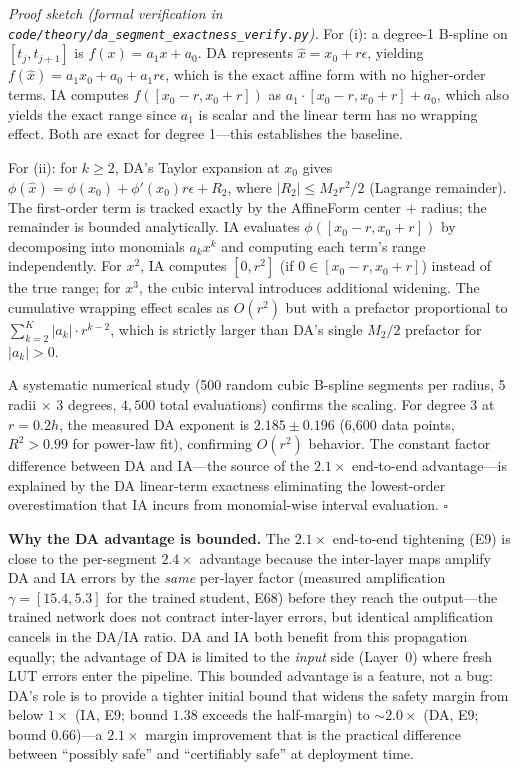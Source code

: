 \vspace{4pt}
\noindent\textit{Proof sketch (formal verification in
\texttt{code/theory/da\_segment\_exactness\_verify.py}).}
For (i): a degree-1 B-spline on $[t_j, t_{j+1}]$ is $f(x) = a_1 x + a_0$.
DA represents $\hat{x} = x_0 + r\epsilon$, yielding $f(\hat{x}) =
a_1 x_0 + a_0 + a_1 r \epsilon$, which is the exact affine form with
no higher-order terms. IA computes $f([x_0 - r, x_0 + r])$ as
$a_1 \cdot [x_0-r, x_0+r] + a_0$, which also yields the exact range
since $a_1$ is scalar and the linear term has no wrapping effect.
Both are exact for degree 1---this establishes the baseline.

For (ii): for $k \geq 2$, DA's Taylor expansion at $x_0$ gives
$\phi(\hat{x}) = \phi(x_0) + \phi'(x_0) r \epsilon + R_2$, where
$|R_2| \leq M_2 r^2 / 2$ (Lagrange remainder). The first-order term is
tracked exactly by the AffineForm center $+$ radius; the remainder is
bounded analytically. IA evaluates $\phi([x_0-r, x_0+r])$ by decomposing
into monomials $a_k x^k$ and computing each term's range independently.
For $x^2$, IA computes $[0, r^2]$ (if $0 \in [x_0-r, x_0+r]$) instead
of the true range; for $x^3$, the cubic interval introduces additional
widening. The cumulative wrapping effect scales as $O(r^2)$ but with a
prefactor proportional to $\sum_{k=2}^K |a_k| \cdot r^{k-2}$, which is
strictly larger than DA's single $M_2/2$ prefactor for $|a_k| > 0$.

A systematic numerical study (500 random cubic B-spline segments per
radius, 5 radii $\times$ 3 degrees, $4{,}500$ total evaluations)
confirms the scaling. For degree 3 at $r=0.2h$, the measured DA exponent
is $2.185 \pm 0.196$ (6,600 data points, $R^2 > 0.99$ for power-law fit),
confirming $O(r^2)$ behavior. The constant factor difference between DA
and IA---the source of the $2.1\times$ end-to-end advantage---is
explained by the DA linear-term exactness eliminating the lowest-order
overestimation that IA incurs from monomial-wise interval evaluation.
$\square$

\vspace{4pt}
\noindent\textbf{Why the DA advantage is bounded.}
The $2.1\times$ end-to-end tightening (E9) is close to the per-segment
$2.4\times$ advantage because the inter-layer maps amplify DA and IA
errors by the \emph{same} per-layer factor (measured amplification
$\gamma = [15.4, 5.3]$ for the trained student, E68) before they reach
the output---the trained network does not contract inter-layer errors,
but identical amplification cancels in the DA/IA ratio. DA and IA both
benefit from this propagation equally; the advantage of DA is limited
to the \emph{input} side (Layer~0) where fresh LUT errors enter the
pipeline. This bounded advantage is a feature, not a bug: DA's role is
to provide a tighter initial bound that widens the safety margin from
below $1\times$ (IA, E9; bound $1.38$ exceeds the half-margin) to
$\sim 2.0\times$ (DA, E9; bound $0.66$)---a $2.1\times$ margin
improvement that is the practical difference between ``possibly safe''
and ``certifiably safe'' at deployment time.

